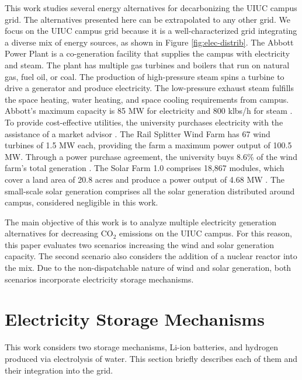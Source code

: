 \documentclass{anstrans}
\begin{document}
This work studies several energy alternatives for decarbonizing the \gls{UIUC} campus grid.
The alternatives presented here can be extrapolated to any other grid.
We focus on the \gls{UIUC} campus grid because it is a well-characterized grid integrating a diverse mix of energy sources, as shown in Figure \ref{fig:elec-distrib}.
The Abbott Power Plant is a co-generation facility that supplies the campus with electricity and steam.
The plant has multiple gas turbines and boilers that run on natural gas, fuel oil, or coal.
The production of high-pressure steam spins a turbine to drive a generator and produce electricity.
The low-pressure exhaust steam fulfills the space heating, water heating, and space cooling requirements from campus.
Abbott’s maximum capacity is 85 MW for electricity and 800 klbs/h for steam \cite{uiucfs_abbott_nodate}.
To provide cost-effective utilities, the university purchases electricity with the assistance of a market advisor \cite{uiucfs_energy_2015}.
The Rail Splitter Wind Farm has 67 wind turbines of 1.5 MW each, providing the farm a maximum power output of 100.5 MW.
Through a power purchase agreement, the university buys 8.6\% of the wind farm's total generation \cite{rail_splitter_illinois_2016, uiucfs_energy_2015}.
The Solar Farm 1.0 comprises 18,867 modules, which cover a land area of 20.8 acres and produce a power output of 4.68 MW \cite{uiucfs_solar_2017}.
The small-scale solar generation comprises all the solar generation distributed around campus, considered negligible in this work.

The main objective of this work is to analyze multiple electricity generation alternatives for decreasing CO$_2$ emissions on the UIUC campus.
For this reason, this paper evaluates two scenarios increasing the wind and solar generation capacity.
The second scenario also considers the addition of a nuclear reactor into the mix.
Due to the non-dispatchable nature of wind and solar generation, both scenarios incorporate electricity storage mechanisms.


\section{Electricity Storage Mechanisms}

This work considers two storage mechanisms, Li-ion batteries, and hydrogen produced via electrolysis of water.
This section briefly describes each of them and their integration into the grid.
\end{document}

